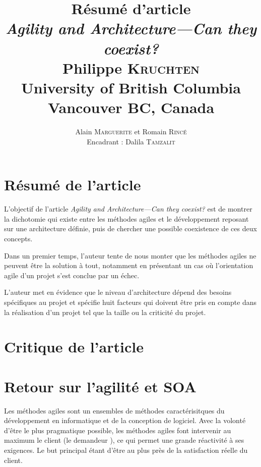 \documentclass[12pt,a4paper,utf8x]{article}
\title{{\large \textbf{Résumé d'article}\\\emph{Agility and Architecture—Can they coexist?}\\\vspace{1ex}
 {\scriptsize Philippe \textsc{Kruchten}\\\vspace{0.5ex}University of British Columbia\\\vspace{-4ex}
Vancouver BC, Canada}}}
\author{\small Alain \textsc{Marguerite} et Romain \textsc{Rincé}\\{\small Encadrant : Dalila \textsc{Tamzalit}}}
\date{}
\begin{document}
\maketitle
\renewcommand{\labelitemi}{$\bullet$} 


\section{Résumé de l'article}\label{sec:res}
L'objectif de l'article \emph{Agility and Architecture—Can they coexist?}  \cite{krutchen} est de montrer la dichotomie qui existe entre les méthodes agiles et le développement reposant sur une architecture définie, puis de chercher une possible coexistence de ces deux concepts. 

Dans un premier temps, l'auteur tente de nous monter que les méthodes agiles ne peuvent être la solution à tout, notamment en présentant un cas où l'orientation agile d'un projet s'est conclue par un échec. 

L'auteur met en évidence que le \og niveau\fg{} d'architecture dépend des besoins spécifiques au projet et spécifie huit facteurs qui doivent être pris en compte dans la réalisation d'un projet tel que la taille ou la criticité du projet.

\section{Critique de l'article}\label{sec:cri}


\section{Retour sur l'agilité et SOA}\label{sec:ret}
Les méthodes agiles sont un ensembles de méthodes caractérisitques du développement en informatique et de la conception de logiciel. Avec la volonté d'être le plus pragmatique possible, les méthodes agiles font intervenir au maximum le client (le \og demandeur \fg{}), ce qui permet une grande réactivité à ses exigences. Le but principal étant d'être au plus près de la satisfaction réelle du client.
\end{document}
